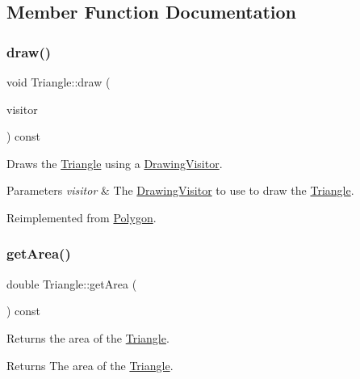 \subsection{Member Function Documentation}
\hypertarget{class_triangle_a1fa834143ed718605959a227eba573b3}{}\label{class_triangle_a1fa834143ed718605959a227eba573b3} 
\subsubsection{\texorpdfstring{draw()}{draw()}}
{\footnotesize\ttfamily void Triangle\+::draw (\begin{DoxyParamCaption}\item[{\hyperlink{class_drawing_visitor}{Drawing\+Visitor} $\ast$}]{visitor }\end{DoxyParamCaption}) const\hspace{0.3cm}{\ttfamily [virtual]}}

Draws the \hyperlink{class_triangle}{Triangle} using a \hyperlink{class_drawing_visitor}{Drawing\+Visitor}. 
\begin{DoxyParams}{Parameters}
{\em visitor} & The \hyperlink{class_drawing_visitor}{Drawing\+Visitor} to use to draw the \hyperlink{class_triangle}{Triangle}. \\
\hline
\end{DoxyParams}


Reimplemented from \hyperlink{class_polygon_a245c526a6a65ea99f5549fe5243006d0}{Polygon}.

\hypertarget{class_triangle_a5f7fa9fd678345063e50e3458d943a9b}{}\label{class_triangle_a5f7fa9fd678345063e50e3458d943a9b} 
\subsubsection{\texorpdfstring{get\+Area()}{getArea()}}
{\footnotesize\ttfamily double Triangle\+::get\+Area (\begin{DoxyParamCaption}{ }\end{DoxyParamCaption}) const\hspace{0.3cm}{\ttfamily [virtual]}}

Returns the area of the \hyperlink{class_triangle}{Triangle}. \begin{DoxyReturn}{Returns}
The area of the \hyperlink{class_triangle}{Triangle}. 
\end{DoxyReturn}


